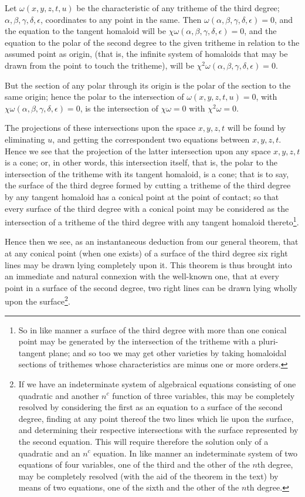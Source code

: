 \documentclass[11pt]{article}
\newcommand{\sourcepage}[1]{\marginpar{\scriptsize p.~#1}}
\begin{document}
{{Let $\omega(x,y,z,t,u)$ be the characteristic of any tritheme of the third degree; $\alpha,\beta,\gamma,\delta,\epsilon$, coordinates to any point in the same. Then $\omega(\alpha,\beta,\gamma,\delta,\epsilon)=0$, and the equation to the tangent homaloid will be $\chi\omega(\alpha,\beta,\gamma,\delta,\epsilon)=0$, and the equation to the polar of the second degree to the given tritheme in relation to the assumed point as origin, (that is, the infinite system of homaloids that may be drawn from the point to touch the tritheme), will be $\chi^2\omega(\alpha,\beta,\gamma,\delta,\epsilon)=0$.

But the section of any polar through its origin is the polar of the section to the same origin; hence the polar to the intersection of $\omega(x,y,z,t,u)=0$, with $\chi\omega(\alpha,\beta,\gamma,\delta,\epsilon)=0$, is the intersection of $\chi\omega=0$ with $\chi^2\omega=0$.

The projections of these intersections upon the space $x,y,z,t$ will be found by eliminating $u$, and getting the correspondent two equations between $x,y,z,t$. Hence we see that the projection of the latter intersection upon any space $x,y,z,t$ is a cone; or, in other words, this intersection itself, that is, the polar to the intersection of the tritheme with its tangent homaloid, is a cone; that is to say, the surface of the third degree formed by cutting a tritheme of the third degree by any tangent homaloid has a conical point at the point of contact; so that every surface of the third degree with a conical point may be considered as the intersection of a tritheme of the third degree with any tangent homaloid thereto\footnote{So in like manner a surface of the third degree with more than one conical point may be generated by the intersection of the tritheme with a pluri-tangent plane; and so too we may get other varieties by taking homaloidal sections of trithemes whose characteristics are minus one or more orders.}.

\sourcepage{177}
Hence then we see, as an instantaneous deduction from our general theorem, that at any conical point (when one exists) of a surface of the third degree six right lines may be drawn lying completely upon it. This theorem is thus brought into an immediate and natural connexion with the well-known one, that at every point in a surface of the second degree, two right lines can be drawn lying wholly upon the surface\footnote{If we have an indeterminate system of algebraical equations consisting of one quadratic and another $n^c$ function of three variables, this may be completely resolved by considering the first as an equation to a surface of the second degree, finding at any point thereof the two lines which lie upon the surface, and determining their respective intersections with the surface represented by the second equation. This will require therefore the solution only of a quadratic and an $n^c$ equation. In like manner an indeterminate system of two equations of four variables, one of the third and the other of the $n$th degree, may be completely resolved (with the aid of the theorem in the text) by means of two equations, one of the sixth and the other of the $n$th degree.}.

}}
\end{document}
